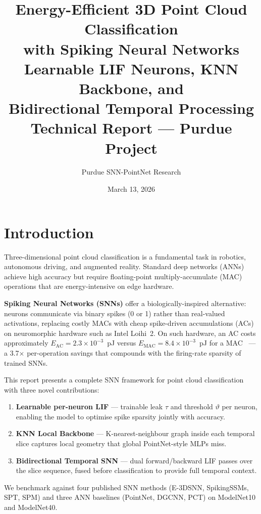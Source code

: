 \documentclass[11pt,a4paper]{article}
\title{%
  \textbf{Energy-Efficient 3D Point Cloud Classification\\
  with Spiking Neural Networks}\\[6pt]
  \large Learnable LIF Neurons, KNN Backbone, and\\
  Bidirectional Temporal Processing\\[6pt]
  \normalsize Technical Report --- Purdue Project
}
\author{Purdue SNN-PointNet Research}
\date{March 13, 2026}
\begin{document}
\maketitle
\tableofcontents
\clearpage

\section{Introduction}

Three-dimensional point cloud classification is a fundamental task in robotics,
autonomous driving, and augmented reality. Standard deep networks (ANNs) achieve
high accuracy but require floating-point multiply-accumulate (MAC) operations that
are energy-intensive on edge hardware.

\textbf{Spiking Neural Networks (SNNs)} offer a biologically-inspired alternative:
neurons communicate via binary spikes (0 or 1) rather than real-valued activations,
replacing costly MACs with cheap spike-driven accumulations (ACs) on neuromorphic
hardware such as Intel Loihi~2. On such hardware, an AC costs approximately
$E_\text{AC} = 2.3 \times 10^{-3}$~pJ versus $E_\text{MAC} = 8.4 \times 10^{-3}$~pJ
for a MAC~\cite{lemaire2022} --- a 3.7$\times$ per-operation savings that compounds
with the firing-rate sparsity of trained SNNs.

This report presents a complete SNN framework for point cloud classification with
three novel contributions:

\begin{enumerate}
  \item \textbf{Learnable per-neuron LIF} --- trainable leak $\tau$ and threshold
        $\vartheta$ per neuron, enabling the model to optimise spike sparsity jointly
        with accuracy.
  \item \textbf{KNN Local Backbone} --- K-nearest-neighbour graph inside each
        temporal slice captures local geometry that global PointNet-style MLPs miss.
  \item \textbf{Bidirectional Temporal SNN} --- dual forward/backward LIF passes
        over the slice sequence, fused before classification to provide full temporal
        context.
\end{enumerate}

We benchmark against four published SNN methods (E-3DSNN, SpikingSSMs, SPT, SPM)
and three ANN baselines (PointNet, DGCNN, PCT) on ModelNet10 and ModelNet40.
\end{document}
